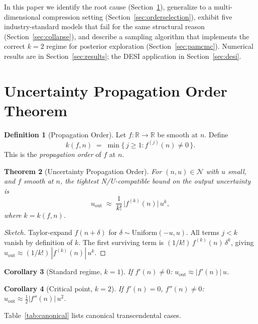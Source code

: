 \documentclass[11pt]{article}
\newtheorem{theorem}{Theorem}[section]
\newtheorem{corollary}[theorem]{Corollary}
\theoremstyle{definition}
\newtheorem{definition}[theorem]{Definition}
\begin{document}
In this paper we identify the root cause (Section~\ref{sec:theorem}),
generalize to a multi-dimensional compression setting
(Section~\ref{sec:orderselection}), exhibit five industry-standard models
that fail for the same structural reason
(Section~\ref{sec:collapse}),
and describe a sampling algorithm that implements the correct $k=2$ regime
for posterior exploration (Section~\ref{sec:pamcmc}).
Numerical results are in Section~\ref{sec:results}; the DESI application in
Section~\ref{sec:desi}.

\section{Uncertainty Propagation Order Theorem}
\label{sec:theorem}

\begin{definition}[Propagation Order]
Let $f : \mathbb{R} \to \mathbb{R}$ be smooth at $n$.  Define
\[
  k(f, n) \;=\; \min\{\,j \ge 1 : f^{(j)}(n) \ne 0\,\}.
\]
This is the \emph{propagation order} of $f$ at $n$.
\end{definition}

\begin{theorem}[Uncertainty Propagation Order]
\label{thm:propagation}
For $(n, u) \in \mathcal{N}$ with $u$ small, and $f$ smooth at $n$,
the tightest N/U-compatible bound on the output uncertainty is
\[
  u_{\mathrm{out}} \;\approx\; \frac{1}{k!}\,\bigl|f^{(k)}(n)\bigr|\,u^k,
\]
where $k = k(f, n)$.
\end{theorem}

\begin{proof}[Sketch]
Taylor-expand $f(n + \delta)$ for $\delta \sim \mathrm{Uniform}(-u,u)$.
All terms $j < k$ vanish by definition of $k$.
The first surviving term is $(1/k!)\,f^{(k)}(n)\,\delta^k$, giving
$u_{\mathrm{out}} \approx (1/k!)\,|f^{(k)}(n)|\,u^k$.
\end{proof}

\begin{corollary}[Standard regime, $k=1$]
If $f'(n) \ne 0$: $u_{\mathrm{out}} \approx |f'(n)|\,u$.
\end{corollary}

\begin{corollary}[Critical point, $k=2$]
If $f'(n)=0$, $f''(n)\ne 0$: $u_{\mathrm{out}} \approx \tfrac{1}{2}|f''(n)|\,u^2$.
\end{corollary}

Table~\ref{tab:canonical} lists canonical transcendental cases.
\end{document}
